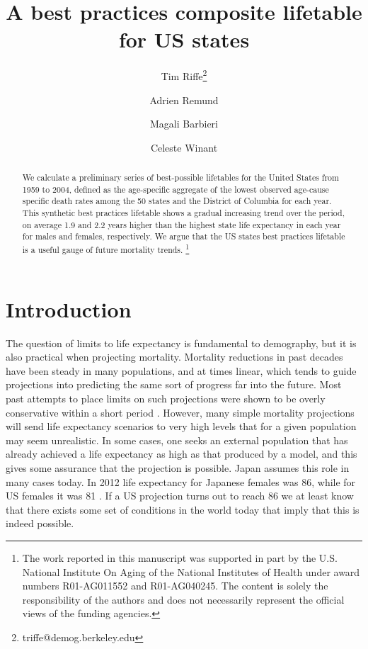 \documentclass[11pt,oneside,a4paper]{article} %
\newcommand\ackn[1]{%
  \begingroup
  \renewcommand\thefootnote{}\footnote{#1}%
  \addtocounter{footnote}{-1}%
  \endgroup
}
\begin{document}
\title{A best practices composite lifetable for US states}

\author[1]{Tim Riffe\thanks{triffe@demog.berkeley.edu}}
\author[2,3]{Adrien Remund}
\author[3,4]{Magali Barbieri}
\author[4]{Celeste Winant}


\maketitle

\begin{abstract}
We calculate a preliminary series of best-possible lifetables for the United
States from 1959 to 2004, defined as the age-specific aggregate of the lowest
observed age-cause specific death rates among the 50
states and the District of Columbia for each year. This synthetic best practices lifetable shows a gradual
increasing trend over the period, on average 1.9 and 2.2 years higher
than the highest state life expectancy in each year for males and females,
respectively. We argue that the US states best practices lifetable is a useful
gauge of future mortality trends.
\ackn{The work reported in this manuscript was supported in part by the U.S.
National Institute On Aging of the National Institutes of Health under award
numbers R01-AG011552 and R01-AG040245. The content is solely the responsibility of the authors and does not necessarily represent the official views of the funding agencies.}
\end{abstract}


\section*{Introduction}

The question of limits to life expectancy is fundamental to demography, but it
is also practical when projecting mortality. Mortality reductions in past
decades have been steady in many populations, and at times linear, which tends
to guide projections into predicting the same sort of progress far into the
future. Most past attempts to place limits on such projections were shown to be
overly conservative within a short period \citep{oeppen2002broken}.
However, many simple mortality projections will send life expectancy scenarios
to very high levels that for a given population may seem unrealistic. In some
cases, one seeks an external population that has already achieved a life
expectancy as high as that produced by a model, and this gives some assurance
that the projection is possible. Japan assumes this role in many cases today. In
2012 life expectancy for Japanese females was 86, while for US females it was 81
\citep{HMD}. If a US projection turns out to reach 86 we at least know that
there exists some set of conditions in the world today that imply that this is
indeed possible.
\end{document}
